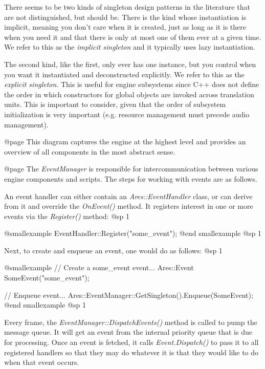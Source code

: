 There seems to be two kinds of singleton design patterns in the literature that are not distinguished, but should be. There is the kind whose instantiation is implicit, meaning you don't care when it is created, just as long as it is there when you need it and that there is only at most one of them ever at a given time. We refer to this as the {\sl implicit singleton} and it typically uses lazy instantiation.

The second kind, like the first, only ever has one instance, but you control when you want it instantiated and deconstructed explicitly. We refer to this as the {\sl explicit singleton}. This is useful for engine subsystems since C++ does not define the order in which constructors for global objects are invoked across translation units. This is important to consider, given that the order of subsystem initialization is very important (e.g. resource management must precede audio management).

    {}

@page
This diagram captures the engine at the highest level and provides an overview of all components in the most abstract sense.

    {}

@page 
The {\sl EventManager} is responsible for intercommunication between various engine components and scripts. The steps for working with events are as follows.

An event handler can either contain an {\sl Ares::EventHandler} class, or can derive from it and override the {\sl OnEvent()} method. It registers interest in one or more events via the {\sl Register()} method:
@sp 1

@smallexample
EventHandler::Register("some_event");
@end smallexample
@sp 1

Next, to create and enqueue an event, one would do as follows:
@sp 1

@smallexample
// Create a some_event event...
Ares::Event SomeEvent("some_event");

// Enqueue event...
Ares::EventManager::GetSingleton().Enqueue(SomeEvent);
@end smallexample
@sp 1

Every frame, the {\sl EventManager::DispatchEvents()} method is called to pump the message queue. It will get an event from the internal priority queue that is due for processing. Once an event is fetched, it calls {\sl Event.Dispatch()} to pass it to all registered handlers so that they may do whatever it is that they would like to do when that event occurs.

